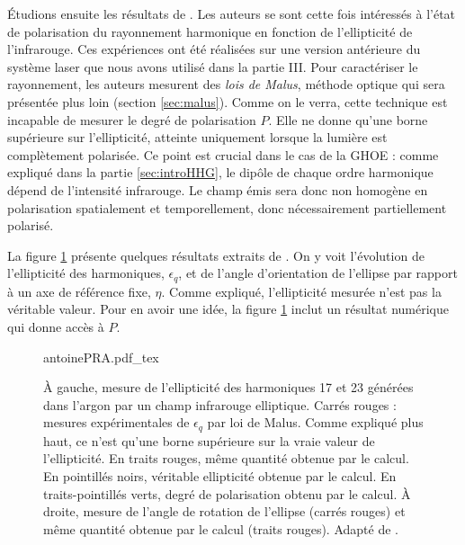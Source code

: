 \'{E}tudions ensuite les résultats de . Les auteurs se sont cette fois intéressés à l'état de polarisation du rayonnement harmonique en fonction de l'ellipticité de l'infrarouge. Ces expériences ont été réalisées sur une version antérieure du système laser que nous avons utilisé dans la partie III. Pour caractériser le rayonnement, les auteurs mesurent des \textit{lois de Malus}, méthode optique qui sera présentée plus loin (section \ref{sec:malus}). Comme on le verra, cette technique est incapable de mesurer le degré de polarisation $P$. Elle ne donne qu'une borne supérieure sur l'ellipticité, atteinte uniquement lorsque la lumière est complètement polarisée. Ce point est crucial dans le cas de la GHOE : comme expliqué dans la partie \ref{sec:introHHG}, le dipôle de chaque ordre harmonique dépend de l'intensité infrarouge. Le champ émis sera donc non homogène en polarisation spatialement et temporellement, donc nécessairement partiellement polarisé.

La figure \ref{fig:antoinepra} présente quelques résultats extraits de . On y voit l'évolution de l'ellipticité des harmoniques, $\epsilon_q$, et de l'angle d'orientation de l'ellipse par rapport à un axe de référence fixe, $\eta$. Comme expliqué, l'ellipticité mesurée n'est pas la véritable valeur. Pour en avoir une idée, la figure \ref{fig:antoinepra} inclut un résultat numérique qui donne accès à $P$.

\begin{figure}[!ht]
\centering
\def\svgwidth{\columnwidth}
{antoinePRA.pdf_tex}
\caption{\`{A} gauche, mesure de l'ellipticité des harmoniques 17 et 23 générées dans l'argon par un champ infrarouge elliptique. Carrés rouges : mesures expérimentales de $\epsilon_q$ par loi de Malus. Comme expliqué plus haut, ce n'est qu'une borne supérieure sur la vraie valeur de l'ellipticité. En traits rouges, même quantité obtenue par le calcul. En pointillés noirs, véritable ellipticité obtenue par le calcul. En traits-pointillés verts, degré de polarisation obtenu par le calcul. \`{A} droite, mesure de l'angle de rotation de l'ellipse (carrés rouges) et même quantité obtenue par le calcul (traits rouges). Adapté de .}
\label{fig:antoinepra}
\end{figure}

